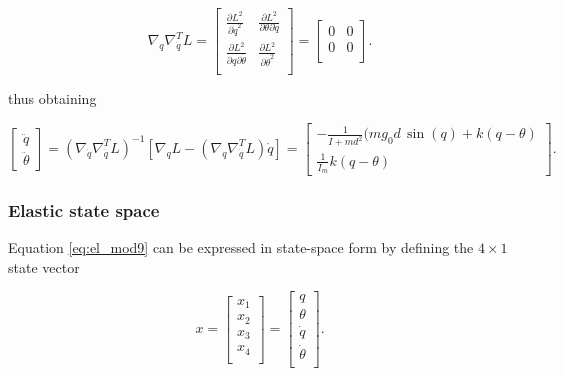 \documentclass[a4paper]{article}
\begin{document}
\begin{equation}
    \nonumber
    \nabla_{q} \nabla_{\dot{q}}^{T} L =
    \begin{bmatrix}
        \frac{\partial L^2}{\partial \dot{q}^2} & \frac{\partial L^2}{\partial \theta \partial \dot{q}} \\
        \frac{\partial L^2}{\partial q \partial \dot{\theta}} & \frac{\partial L^2}{\partial \dot{\theta}^2} \\
    \end{bmatrix} =
    \begin{bmatrix}
        0 & 0 \\
        0 & 0 \\
    \end{bmatrix}.
\end{equation}


thus obtaining

\begin{equation}
    \label{eq:rig_eul_lag_7}
    \nonumber
    \begin{bmatrix}    
        \ddot{q} \\
        \ddot{\theta}
    \end{bmatrix} = (\nabla_{\dot{q}}\nabla_{\dot{q}}^T L)^{-1} [\nabla_{q} L - (\nabla_{q}\nabla_{\dot{q}}^T L)\dot{q}] =
    \begin{bmatrix}
        -\frac{1}{I+md^2} (mg_0d\, \sin(q) + k(q-\theta)\\
        \frac{1}{I_m} k(q-\theta)
    \end{bmatrix}.
\end{equation}
\subsubsection{Elastic state space}
Equation \eqref{eq:el_mod9} can be expressed in state-space form by defining the $4\times1$ state vector

\begin{equation}
    \nonumber
    x = 
    \begin{bmatrix}    
        x_1 \\
        x_2 \\
        x_3 \\
        x_4 \\
    \end{bmatrix} = \begin{bmatrix}    
        q\\
        \theta\\
        \dot{q}\\
        \dot{\theta}\\
    \end{bmatrix}.
\end{equation}
\end{document}
